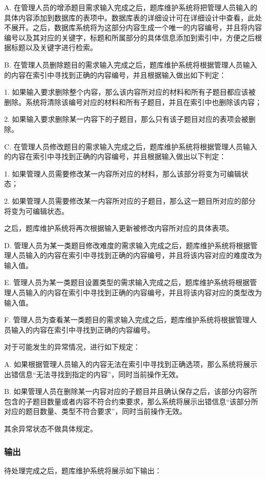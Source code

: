 A. 在管理人员的增添题目需求输入完成之后，题库维护系统将把管理人员输入的具体内容添加到数据库的表项中。数据库表的详细设计可在详细设计中查看，此处不展开。之后，数据库系统将为这部分内容生成一个唯一的内容编号，并且将内容编号以及其对应的关键字，标题和所属部分的具体信息添加到索引中，方便之后根据标题以及关键字进行检索。

B. 在管理人员删除题目的需求输入完成之后，题库维护系统将根据管理人员输入的内容在索引中寻找到正确的内容编号，并且根据输入做出如下判定：

	1. 如果输入要求删除整个内容，那么该内容所对应的材料和所有子题目都应该被删除。系统将清除该编号对应的材料和所有子题目，并且在索引中也删除该内容；

	2. 如果输入要求删除某一内容下的子题目，那么只有该子题目对应的表项会被删除。

C. 在管理人员修改题目的需求输入完成之后，题库维护系统将根据管理人员输入的内容在索引中寻找到正确的内容编号，并且根据输入做出以下判定：

	1. 如果管理人员需要修改某一内容所对应的材料，那么该部分将变为可编辑状态；

	2. 如果管理人员需要修改某一内容所对应的子题目，那么这一题目所对应的部分将变为可编辑状态。

	之后，题库维护系统将再次根据输入更新被修改内容所对应的具体表项。

D. 管理人员为某一类题目修改难度的需求输入完成之后，题库维护系统将根据管理人员输入的内容在索引中寻找到正确的内容编号，并且将该内容对应的难度改为输入值。

E. 管理人员为某一类题目设置类型的需求输入完成之后，题库维护系统将根据管理人员输入的内容在索引中寻找到正确的内容编号，并且将该内容对应的类型改为输入值。

F. 管理人员为查看某一类题目的需求输入完成之后，题库维护系统将根据管理人员输入的内容在索引中寻找到正确的内容编号。

对于可能发生的异常情况，进行如下规定：

A. 如果根据管理人员输入的内容无法在索引中寻找到正确选项，那么系统将展示出错信息“无法寻找到指定的内容”，同时当前操作无效。

B. 如果管理人员在删除某一内容对应的子题目并且确认保存之后，该部分内容所包含的子题目数量或者内容不符合约束要求，那么系统将展示出错信息“该部分所对应的题目数量、类型不符合要求”，同时当前操作无效。

其余异常状态不做具体规定。

\subsubsection{输出}
待处理完成之后，题库维护系统将展示如下输出：

